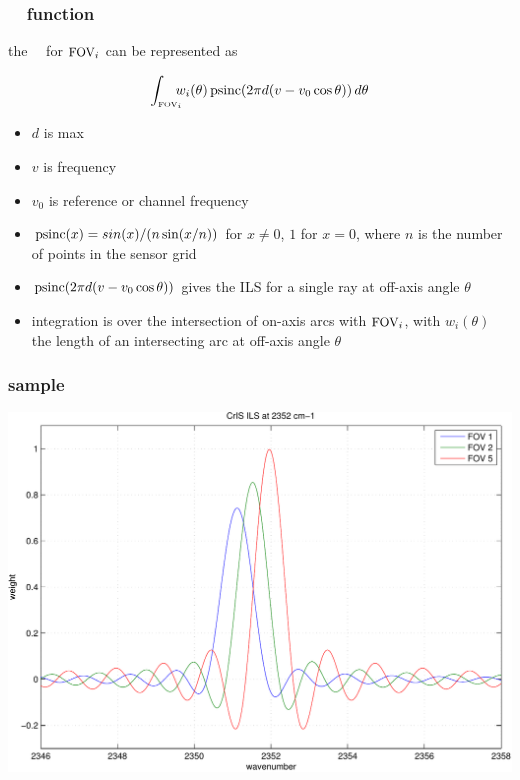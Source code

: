 \documentclass[11pt]{beamer}
\begin{document}
\begin{frame}
\frametitle{\ccast\ \ils\ function}

the \ccast\ \ils\ for $\mbox{\small FOV}_i$ can be represented as

\[\int_{\mbox{\tiny FOV}_i} \!\!\!\! w_i(\theta)\, \mbox{psinc}(2 \pi
                 d(v - v_0 \cos \theta ))\, d\theta \]


\begin{itemize}
  \item $d$ is max \opd
  \item $v$ is frequency
  \item $v_0$ is reference or channel frequency
  \item $\mbox{psinc}(x) = sin(x)/(n \sin(x/n))$ for $x \ne 0$,  $1$ for
    $x = 0$, where $n$ is the number of points in the sensor grid
   \item $\mbox{psinc}(2 \pi d(v - v_0 \cos \theta ))$ gives the ILS for a
    single ray at off-axis angle $\theta$
  \item integration is over the intersection of on-axis arcs with
    $\mbox{\small FOV}_i$, with $w_i(\theta)$ the length of an intersecting arc
    at off-axis angle $\theta$
\end{itemize}

\end{frame}
\begin{frame}
\frametitle{sample \ccast\ \ils}
\begin{center}
  \includegraphics[scale=0.5]{figures/ILS_SW_demo.pdf}
\end{center}
\end{frame}
\end{document}
